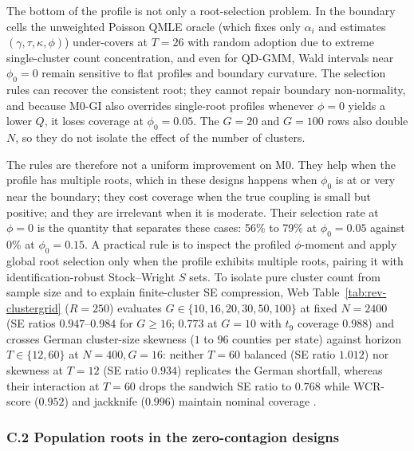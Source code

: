 The bottom of the profile is not only a root-selection problem. In the boundary cells the
unweighted Poisson QMLE oracle (which fixes only $\alpha_i$ and estimates $(\gamma,\tau,\kappa,\phi)$)
under-covers at $T=26$ with random adoption due to extreme single-cluster count concentration, and
even for QD-GMM, Wald intervals near $\phi_0=0$ remain sensitive to flat profiles and boundary
curvature. The selection rules can recover the consistent root; they cannot repair boundary
non-normality, and because M0-GI also overrides single-root profiles whenever $\phi=0$ yields a
lower $Q$, it loses coverage at $\phi_0=0.05$. The $G=20$ and $G=100$ rows also double $N$, so they
do not isolate the effect of the number of clusters.

The rules are therefore not a uniform improvement on M0. They help when the profile has multiple
roots, which in these designs happens when $\phi_0$ is at or very near the boundary; they cost
coverage when the true coupling is small but positive; and they are irrelevant when it is
moderate. Their selection rate at $\phi=0$ is the quantity that separates these cases: 56\% to 79\%
at $\phi_0=0.05$ against 0\% at $\phi_0=0.15$. A practical rule is to inspect the profiled $\phi$-moment and apply global root selection only when
the profile exhibits multiple roots, pairing it with identification-robust Stock--Wright $S$ sets. To isolate pure cluster count from sample size and to explain finite-cluster SE compression, Web Table~\ref{tab:rev-clustergrid} ($R=250$) evaluates $G\in\{10,16,20,30,50,100\}$ at fixed $N=2400$ (SE ratios $0.947$--$0.984$ for $G\ge 16$; $0.773$ at $G=10$ with $t_9$ coverage $0.988$) and crosses German cluster-size skewness ($1$ to $96$ counties per state) against horizon $T\in\{12,60\}$ at $N=400, G=16$: neither $T=60$ balanced (SE ratio $1.012$) nor skewness at $T=12$ (SE ratio $0.934$) replicates the German shortfall, whereas their interaction at $T=60$ drops the sandwich SE ratio to $0.768$ while WCR-score ($0.952$) and jackknife ($0.996$) maintain nominal coverage \citep{mackinnon2018few,mackinnon2023jackknife,hwang2021simple}.

\subsubsection{C.2 Population roots in the zero-contagion designs}
\label{app:poproots}



